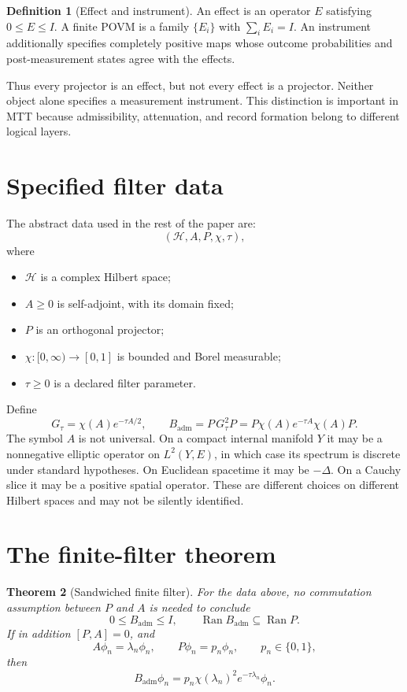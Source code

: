 \documentclass[11pt]{article}
\newtheorem{theorem}{Theorem}[section]
\theoremstyle{definition}
\newtheorem{definition}[theorem]{Definition}
\theoremstyle{remark}
\newcommand{\Hspace}{\mathcal H}
\newcommand{\Badm}{B_{\mathrm{adm}}}
\newcommand{\Ran}{\operatorname{Ran}}
\newcommand{\Id}{I}
\begin{document}
\begin{definition}[Effect and instrument]
An effect is an operator \(E\) satisfying \(0\leq E\leq\Id\). A finite POVM
is a family \(\{E_i\}\) with \(\sum_iE_i=\Id\). An instrument additionally
specifies completely positive maps whose outcome probabilities and
post-measurement states agree with the effects.
\end{definition}

Thus every projector is an effect, but not every effect is a projector.
Neither object alone specifies a measurement instrument. This distinction is
important in MTT because admissibility, attenuation, and record formation
belong to different logical layers.

\section{Specified filter data}

The abstract data used in the rest of the paper are:
\[
(\Hspace,A,P,\chi,\tau),
\]
where
\begin{itemize}
\item \(\Hspace\) is a complex Hilbert space;
\item \(A\geq0\) is self-adjoint, with its domain fixed;
\item \(P\) is an orthogonal projector;
\item \(\chi:[0,\infty)\to[0,1]\) is bounded and Borel measurable;
\item \(\tau\geq0\) is a declared filter parameter.
\end{itemize}

Define
\begin{equation}
 G_\tau=\chi(A)e^{-\tau A/2},
 \qquad
 \Badm=P\,G_\tau^2P
       =P\chi(A)e^{-\tau A}\chi(A)P.
 \label{eq:Badm}
\end{equation}
The symbol \(A\) is not universal. On a compact internal manifold \(Y\) it
may be a nonnegative elliptic operator on \(L^2(Y,E)\), in which case its
spectrum is discrete under standard hypotheses. On Euclidean spacetime it
may be \(-\Delta\). On a Cauchy slice it may be a positive spatial operator.
These are different choices on different Hilbert spaces and may not be
silently identified.

\section{The finite-filter theorem}

\begin{theorem}[Sandwiched finite filter]
\label{thm:filter}
For the data above, no commutation assumption between \(P\) and \(A\) is
needed to conclude
\[
 0\leq \Badm\leq\Id,
 \qquad
 \Ran\Badm\subseteq\Ran P.
\]
If in addition \([P,A]=0\), and
\[
 A\phi_n=\lambda_n\phi_n,\qquad
 P\phi_n=p_n\phi_n,\qquad p_n\in\{0,1\},
\]
then
\[
 \Badm\phi_n
 =p_n\chi(\lambda_n)^2e^{-\tau\lambda_n}\phi_n.
\]
\end{theorem}
\end{document}
